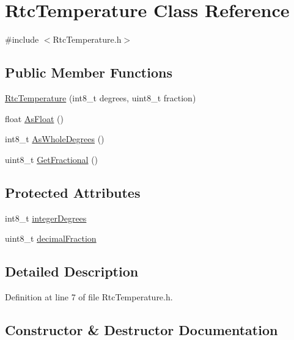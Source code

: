 \hypertarget{class_rtc_temperature}{}\section{Rtc\+Temperature Class Reference}
\label{class_rtc_temperature}


{\ttfamily \#include $<$Rtc\+Temperature.\+h$>$}

\subsection*{Public Member Functions}
\begin{DoxyCompactItemize}
\item 
\hyperlink{class_rtc_temperature_ad2451331d4628710b9ee90e059d3a609}{Rtc\+Temperature} (int8\+\_\+t degrees, uint8\+\_\+t fraction)
\item 
float \hyperlink{class_rtc_temperature_a66cad4659d608328d33d4ed76f2bf8e3}{As\+Float} ()
\item 
int8\+\_\+t \hyperlink{class_rtc_temperature_ad25dfecb2cb5cea4cb10dca924189bbf}{As\+Whole\+Degrees} ()
\item 
uint8\+\_\+t \hyperlink{class_rtc_temperature_a43db6721d211076dcd27f2aa4aa3a55a}{Get\+Fractional} ()
\end{DoxyCompactItemize}
\subsection*{Protected Attributes}
\begin{DoxyCompactItemize}
\item 
int8\+\_\+t \hyperlink{class_rtc_temperature_ad547d34004a4e218f7acea867e171789}{integer\+Degrees}
\item 
uint8\+\_\+t \hyperlink{class_rtc_temperature_ad79bd5745166a107292964ed6af3b57b}{decimal\+Fraction}
\end{DoxyCompactItemize}


\subsection{Detailed Description}


Definition at line 7 of file Rtc\+Temperature.\+h.



\subsection{Constructor \& Destructor Documentation}
